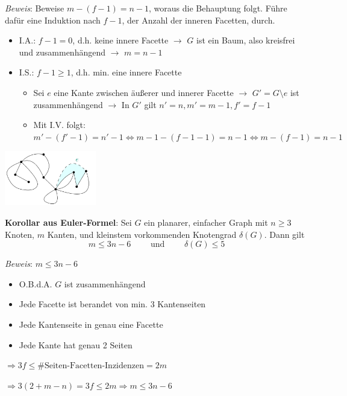 \textit{Beweis}: Beweise $m-(f-1)=n-1$, woraus die Behauptung folgt. Führe dafür eine Induktion nach $f-1$, der Anzahl der inneren Facetten, durch.
\begin{itemize}
	\item I.A.: $f-1=0$, d.h. keine innere Facette $\rightarrow$ $G$ ist ein Baum, also kreisfrei und zusammenhängend $\rightarrow$ $m=n-1$
	\item I.S.: $f-1\geq 1$, d.h. min. eine innere Facette
	\begin{itemize}
		\item Sei $e$ eine Kante zwischen äußerer und innerer Facette $\rightarrow$ $G'=G\setminus e$ ist zusammenhängend $\rightarrow$ In $G'$ gilt $n'=n,m'=m-1,f'=f-1$
		\item Mit I.V. folgt: $m'-(f'-1)=n'-1\Leftrightarrow m-1-(f-1-1)=n-1 \Leftrightarrow m-(f-1)=n-1$
	\end{itemize}
\end{itemize}
\begin{center}
	\includegraphics[width=0.3\textwidth]{images/euler-proof.png}
\end{center}
\bigskip
\textbf{Korollar aus Euler-Formel}: Sei $G$ ein planarer, einfacher Graph mit $n\geq 3$ Knoten, $m$ Kanten, und kleinstem vorkommenden Knotengrad $\delta(G)$.
Dann gilt 
$$m\leq 3n-6\qquad\text{ und }\qquad \delta(G)\leq 5$$

\textit{Beweis}: $m\leq 3n-6$
\begin{itemize}
	\item O.B.d.A. $G$ ist zusammenhängend
	\item Jede Facette ist berandet von min. 3 Kantenseiten 
	\item Jede Kantenseite in genau eine Facette
	\item Jede Kante hat genau 2 Seiten
\end{itemize}
$\Rightarrow 3f\leq \#\text{Seiten-Facetten-Inzidenzen} =2m$

$\Rightarrow 3(2+m-n)= 3f\leq 2m \Rightarrow m\leq 3n-6$